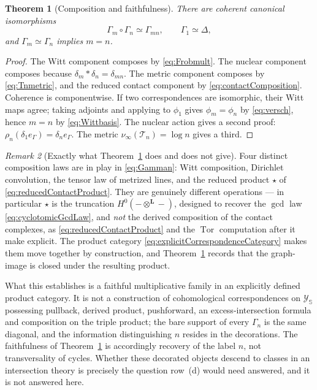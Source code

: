 \documentclass[11pt]{amsart}
\newtheorem{theorem}{Theorem}[section]
\theoremstyle{definition}
\theoremstyle{remark}
\newtheorem{remark}[theorem]{Remark}
\begin{document}
\begin{theorem}[Composition and faithfulness]\label{thm:rowbcompose}
There are coherent canonical isomorphisms
\[
 \Gamma_m\circ\Gamma_n\simeq\Gamma_{mn},\qquad
 \Gamma_1\simeq\Delta,
\]
and $\Gamma_m\simeq\Gamma_n$ implies $m=n$.
\end{theorem}

\begin{proof}
The Witt component composes by \eqref{eq:Frobmult}.  The nuclear component
composes because $\delta_m*\delta_n=\delta_{mn}$.  The metric component
composes by \eqref{eq:Tnmetric}, and the reduced contact component by
\eqref{eq:contactComposition}.  Coherence is componentwise.  If two
correspondences are isomorphic, their Witt maps agree; taking adjoints and
applying to $\phi_1$ gives $\phi_m=\phi_n$ by \eqref{eq:versch}, hence
$m=n$ by \eqref{eq:Wittbasis}.  The nuclear action gives a second proof:
$\rho_n(\delta_1e_\Gamma)=\delta_ne_\Gamma$.  The metric
$\nu_\infty(\mathcal T_n)=\log n$ gives a third.
\end{proof}

\begin{remark}[Exactly what Theorem~\ref{thm:rowbcompose} does and does not
give]\label{rem:rowbscope}
Four distinct composition laws are in play in \eqref{eq:Gamman}: Witt
composition, Dirichlet convolution, the tensor law of metrized lines, and
the reduced product $\star$ of \eqref{eq:reducedContactProduct}.  They are
genuinely different operations --- in particular $\star$ is the truncation
$H^0(-\otimes^{\mathbf L}-)$, designed to recover the $\gcd$ law
\eqref{eq:cyclotomicGcdLaw}, and \emph{not} the derived composition of the
contact complexes, as \eqref{eq:reducedContactProduct} and the
$\operatorname{Tor}$ computation after it make explicit.  The product
category \eqref{eq:explicitCorrespondenceCategory} makes them move together
by construction, and Theorem~\ref{thm:rowbcompose} records that the
graph-image is closed under the resulting product.

What this establishes is a faithful multiplicative family in an explicitly
defined product category.  It is not a construction of cohomological
correspondences on $\mathscr Y_{\mathbb S}$ possessing pullback, derived
product, pushforward, an excess-intersection formula and composition on the
triple product; the bare support of every $\Gamma_n$ is the same diagonal,
and the information distinguishing $n$ resides in the decorations.  The
faithfulness of Theorem~\ref{thm:rowbcompose} is accordingly recovery of the
label $n$, not transversality of cycles.  Whether these decorated objects
descend to classes in an intersection theory is precisely the question
row~(d) would need answered, and it is not answered here.
\end{remark}
\end{document}
